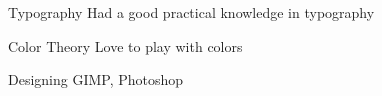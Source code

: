 \cventry{}
    {Typography}
    {}
    {Had a good practical knowledge in typography}
    {}
    {}
    
\cventry{}
{Color Theory}
{}
{Love to play with colors}
{}
{}

\cventry{}
{Designing}
{}
{GIMP, Photoshop}
{}
{}

